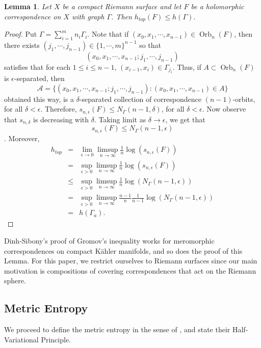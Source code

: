 \documentclass[11pt,letterpaper]{article}
\newtheorem{lemma}[theorem]{Lemma}
\theoremstyle{definition}
\def\orb{\operatorname{Orb}}
\begin{document}
\begin{lemma}\label{entropy inequality}
Let $X$ be a compact Riemann surface and let $F$ be a holomorphic correspondence on $X$ with graph $\Gamma$. Then $h_{top}(F)\leq h(\Gamma)$.
\end{lemma}
\begin{proof}
Put $\Gamma=\sum_{i=1}^m n_i\Gamma_i$. Note that if $(x_0,x_1,\cdots,x_{n-1})\in\orb_n(F)$, then there exists $(j_1,\cdots,j_{n-1})\in\lbrace 1,\cdots, m\rbrace^{n-1}$ so that 
$$(x_0,x_1,\cdots,x_{n-1};j_1,\cdots,j_{n-1})$$
satisfies that for each $1\leq i\leq n-1$, $(x_{i-1},x_i)\in\Gamma_{j_i}$. Thus, if $A\subset\orb_n(F)$ is $\epsilon$-separated, then
$$\mathcal{A}=\lbrace (x_0,x_1,\cdots,x_{n-1};j_1,\cdots,j_{n-1}):(x_0,x_1,\cdots,x_{n-1})\in A\rbrace$$
obtained this way, is a $\delta$-separated collection of correspondence $(n-1)$-orbits, for all $\delta<\epsilon$. Therefore, $s_{n,\epsilon}(F)\leq N_{\Gamma}(n-1,\delta)$, for all $\delta<\epsilon$. Now observe that $s_{n,\delta}$ is decreasing with $\delta$. Taking limit as $\delta\to\epsilon$, we get that 
$$s_{n,\epsilon}(F)\leq N_{\Gamma}(n-1,\epsilon)$$. Moreover,
\begin{eqnarray*}
h_{top}&=&\lim\limits_{\epsilon\to 0}\limsup\limits_{n\to\infty}\frac{1}{n}\log(s_{n,\epsilon}(F))\\
&=&\sup\limits_{\epsilon >0}\limsup_{n\to\infty}\frac{1}{n}\log(s_{n,\epsilon}(F))\\
&\leq&\sup\limits_{\epsilon >0}\limsup\limits_{n\to\infty}\frac{1}{n}\log(N_{\Gamma}(n-1,\epsilon))\\
&=&\sup\limits_{\epsilon >0}\limsup\limits_{n\to\infty}\frac{n-1}{n}\frac{1}{n-1}\log(N_{\Gamma}(n-1,\epsilon))\\
&=&h(\Gamma_a).
\end{eqnarray*}
\end{proof}

Dinh-Sibony's proof of Gromov's inequality works for meromorphic correspondences on compact K\"ahler manifolds, and so does the proof of this Lemma. For this paper, we restrict ourselves to Riemann surfaces since our main motivation is compositions of covering correspondences that act on the Riemann sphere.

\subsection{Metric Entropy} We proceed to define the metric entropy in the sense of \cite{VivSir22}, and state their Half-Variational Principle. 
\end{document}
